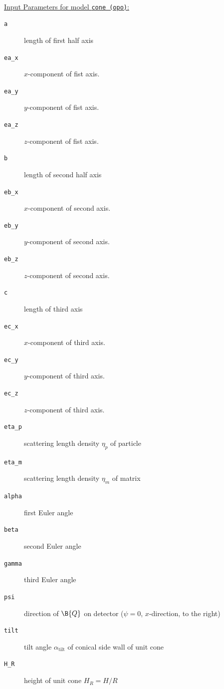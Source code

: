 ~\\
\uline{Input Parameters for model \texttt{cone (opo)}:}
\begin{description}
\item[\texttt{a}] length of first half axis
\item[\texttt{ea\_x}] $x$-component of fist axis.
\item[\texttt{ea\_y}] $y$-component of fist axis.
\item[\texttt{ea\_z}] $z$-component of fist axis.
\item[\texttt{b}] length of second half axis
\item[\texttt{eb\_x}] $x$-component of second axis.
\item[\texttt{eb\_y}] $y$-component of second axis.
\item[\texttt{eb\_z}] $z$-component of second axis.
\item[\texttt{c}] length of third axis
\item[\texttt{ec\_x}] $x$-component of third axis.
\item[\texttt{ec\_y}] $y$-component of third axis.
\item[\texttt{ec\_z}] $z$-component of third axis.
\item[\texttt{eta\_p}] scattering length density $\eta_p$ of particle
\item[\texttt{eta\_m}] scattering length density $\eta_m$ of matrix
\item[\texttt{alpha}] first Euler angle
\item[\texttt{beta}] second Euler angle
\item[\texttt{gamma}] third Euler angle
\item[\texttt{psi}] direction of $\B{Q}$ on detector ($\psi=0$, $x$-direction, to the right)
\item[\texttt{tilt}] tilt angle $\alpha_\mathrm{tilt}$ of conical side wall of unit cone
\item[\texttt{H\_R}] height of unit cone $H_R=H/R$
\end{description}

